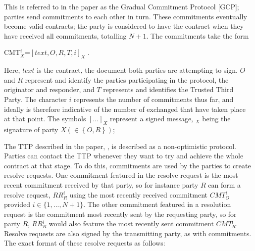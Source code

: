 \documentclass{l4proj}
\begin{document}
This is referred to in the paper as the Gradual Commitment Protocol [GCP]; parties send commitments to each other in turn. These commitments eventually become valid contracts; the party is considered to have the contract when they have received all commitments, totalling $N+1$. The commitments take the form \\

\centerline{CMT${_{X}^{i}}$=$[text, O, R, T, i]_X $ .}

Here, $text$ is the contract, the document both parties are attempting to sign. $O$ and $R$ represent and identify the parties participating in the protocol, the originator and responder, and $T$ represents and identifies the Trusted Third Party. The character $i$ represents the number of commitments thus far, and ideally is therefore indicative of the number of exchanged that have taken place at that point. The symbols $[...]_X$ represent a signed message, $_X$ being the signature of party $X \left ( \in \left \{ O,R \right \} \right )$;

The TTP described in the paper, \cite{ASW09}, is described as a non-optimistic protocol. Parties can contact the TTP whenever they want to try and achieve the whole contract at that stage. To do this, commitments are used by the parties to create resolve requests. One commitment featured in the resolve request is the most recent commitment received by that party, so for instance party $R$ can form a resolve request, $RR{_{R}^{i}}$ using the most recently received commitment $CMT{_{O}^i}$ provided $i \in \{1,...,N+1\}$. The other commitment featured in a resolution request is the commitment most recently sent by the requesting party, so for party $R$, $RR{_{R}^{i}}$ would also feature the most recently sent commitment $CMT{_{R}^i}$. Resolve requests are also signed by the transmitting party, as with commitments. The exact format of these resolve requests as follows:\\
\end{document}
